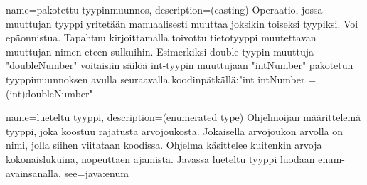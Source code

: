 {
	name=pakotettu tyypinmuunnos,
	description={(casting) Operaatio, jossa muuttujan tyyppi yritetään manuaalisesti muuttaa
joksikin toiseksi tyypiksi. Voi epäonnistua. Tapahtuu kirjoittamalla toivottu tietotyyppi
muutettavan muuttujan nimen eteen sulkuihin. Esimerkiksi double-tyypin muuttuja "doubleNumber"
voitaisiin säilöä int-tyypin muuttujaan "intNumber" pakotetun tyyppimuunnoksen avulla seuraavalla
koodinpätkällä:\newline{}"int intNumber = (int)doubleNumber"}
}

{
	name=lueteltu tyyppi,
	description={(enumerated type) Ohjelmoijan määrittelemä tyyppi, joka koostuu rajatusta
arvojoukosta. Jokaisella arvojoukon arvolla on nimi, jolla siihen viitataan koodissa. Ohjelma
käsittelee kuitenkin arvoja kokonaislukuina, nopeuttaen ajamista. Javassa lueteltu tyyppi luodaan
enum-avainsanalla},
	see={java:enum}
}